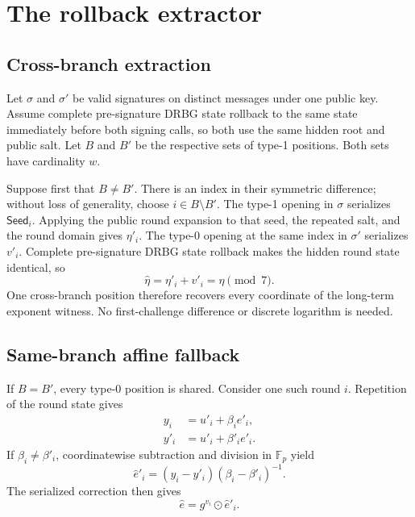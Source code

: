 \documentclass[11pt,a4paper]{article}
\newcommand{\F}{\mathbb F}
\begin{document}
\section{The rollback extractor}

\subsection{Cross-branch extraction}

Let $\sigma$ and $\sigma'$ be valid signatures on distinct messages under one
public key.  Assume complete pre-signature DRBG state rollback to the same state
immediately before both signing calls, so both use the same hidden root and
public salt.  Let $B$ and $B'$ be
the respective sets of type-1 positions.  Both sets have cardinality $w$.

Suppose first that $B\ne B'$.  There is an index in their symmetric
difference; without loss of generality, choose $i\in B\setminus B'$.  The
type-1 opening in $\sigma$ serializes $\mathsf{Seed}_i$.  Applying the public
round expansion to that seed, the repeated salt, and the round domain gives
$\eta'_i$.  The type-0 opening at the same index in $\sigma'$ serializes
$v'_i$.  Complete pre-signature DRBG state rollback makes the hidden round
state identical, so
\begin{equation}
                    \widehat\eta=\eta'_i+v'_i=\eta\pmod 7.
                                                        \label{eq:crossbranch}
\end{equation}
One cross-branch position therefore recovers every coordinate of the long-term
exponent witness.  No first-challenge difference or discrete logarithm is
needed.

\subsection{Same-branch affine fallback}

If $B=B'$, every type-0 position is shared.  Consider one such round $i$.
Repetition of the round state gives
\begin{align}
 y_i  &=u'_i+\beta_i e'_i,\nonumber\\
 y'_i &=u'_i+\beta'_i e'_i.                                 \label{eq:twoy}
\end{align}
If $\beta_i\ne\beta'_i$, coordinatewise subtraction and division in
$\F_p$ yield
\begin{equation}
             \widehat e'_i=(y_i-y'_i)(\beta_i-\beta'_i)^{-1}.
                                                                    \label{eq:extracteprime}
\end{equation}
The serialized correction then gives
\begin{equation}
                     \widehat e=g^{v_i}\odot\widehat e'_i.   \label{eq:extracte}
\end{equation}
\end{document}
